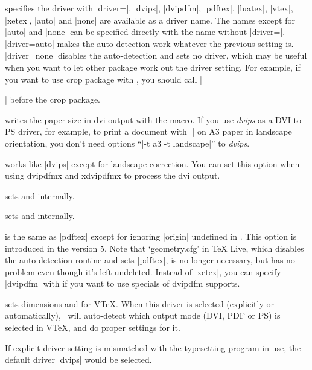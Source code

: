 \begin{Options}
\item[\onlypre driver] specifies the driver with |driver=|. 
|dvips|, |dvipdfm|, |pdftex|, |luatex|, |vtex|, |xetex|, |auto| and |none| are
available as a driver name. The names except for |auto| and |none| can
be specified directly with the name without |driver=|.
|driver=auto| makes the auto-detection work whatever the previous setting is. 
|driver=none| disables the auto-detection and sets no driver, which
may be useful when you want to let other package work out the driver
setting. For example, if you want to use \textsf{crop} package with \Gm,
you should call |\usepackage[driver=none]{geometry}| before
the \textsf{crop} package.
\item[\onlypre dvips] writes the paper size in dvi output with the 
    macro. If you use \textsl{dvips} as a DVI-to-PS driver,
    for example, to print a document with |\geometry{a3paper,landscape}|
    on A3 paper in landscape orientation, you don't need options
    ``|-t a3 -t landscape|'' to \textsl{dvips}. 
\item[\onlypre dvipdfm] works like |dvips| except for landscape correction.
     You can set this option when using \textsf{dvipdfmx} and
     \textsf{xdvipdfmx} to process the dvi output.
\item[\onlypre pdftex] sets  and 
     internally.
\item[\onlypre luatex] sets  and  internally.
\item[\onlypre xetex] is the same as |pdftex| except for ignoring
    |origin| undefined in \XeLaTeX{}. This option is introduced in
    the version 5. Note that `geometry.cfg' in \TeX{} Live, which disables the
    auto-detection routine and sets |pdftex|, is no longer necessary,
    but has no problem even though it's left undeleted.
    Instead of |xetex|, you can specify |dvipdfm| with \XeLaTeX{}
    if you want to use specials of dvipdfm \XeTeX{} supports.
\item[\onlypre vtex] sets dimensions  and 
    for V\TeX. When this driver is selected (explicitly or
    automatically), \Gm\ will auto-detect which output mode
    (DVI, PDF or PS) is selected in V\TeX, and do proper
    settings for it.
\end{Options}
If explicit driver setting is mismatched with the typesetting program
in use, the default driver |dvips| would be selected.

